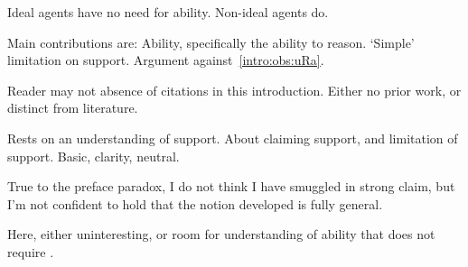 \begin{note}
  Ideal agents have no need for ability.
  Non-ideal agents do.
\end{note}

\begin{note}
  Main contributions are:
  Ability, specifically the ability to reason.
  `Simple' limitation on support.
  Argument against~\ref{intro:obs:uRa}.

  Reader may not absence of citations in this introduction.
  Either no prior work, or distinct from literature.
\end{note}

\begin{note}
  Rests on an understanding of support.
  About claiming support, and limitation of support.
  Basic, clarity, neutral.

  True to the preface paradox, I do not think I have smuggled in strong claim, but I'm not confident to hold that the notion developed is fully general.

  Here, either uninteresting, or room for understanding of ability that does not require \WR{}.
\end{note}